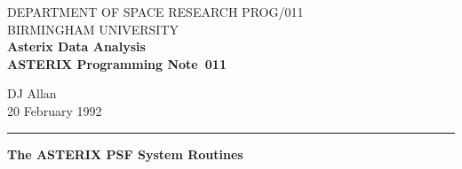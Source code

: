 
\pagestyle{myheadings} 
\newcommand{\astdoccategory}  {ASTERIX Programming Note} 
\newcommand{\astdocinitials}  {PROG} 
\newcommand{\astdocnumber}    {011} 
\newcommand{\astdocauthors}   {DJ Allan} 
\newcommand{\astdocdate}      {20 February 1992} 
\newcommand{\astdoctitle}     {The ASTERIX PSF System Routines} 
\newcommand{\astdocname}      {\astdocinitials /\astdocnumber} 

\renewcommand{\_}             {{\tt\char'137}} 
 
\newcommand{\Array}{\mbox{\tt Array}}
\newcommand{\BinDS}{\mbox{\tt BinDS}}
\newcommand{\EventDS}{\mbox{\tt EventDS}}
\newcommand{\File}{\mbox{\tt File}}
\newcommand{\Scalar}{\mbox{\tt Scalar}}
\newcommand{\VecArray}{\mbox{\tt VectorisedArray}}
\newcommand{\VecBinDS}{\mbox{\tt VectorisedBinDS}}
\newcommand{\XYimage}{\mbox{\tt XYimage}}
\newcommand{\Ind}{\hspace{3mm}}
 
\setlength{\textwidth}{160mm}           %
\setlength{\textheight}{240mm}          %
\setlength{\oddsidemargin}{0pt}         %
\setlength{\evensidemargin}{0pt}        %
\setlength{\topmargin}{-5mm}            %
\setlength{\headsep}{8mm}               %
\setlength{\parindent}{0mm} 
 
\thispagestyle{empty} 
DEPARTMENT OF SPACE RESEARCH \hfill \astdocname\\ 
BIRMINGHAM UNIVERSITY\\ 
{\large\bf Asterix Data Analysis\\} 
{\large\bf \astdoccategory\ \astdocnumber} 
\begin{flushright} 
\astdocauthors\\ 
\astdocdate 
\end{flushright} 
\vspace{-4mm} 
\rule{\textwidth}{0.5mm} 
\vspace{5mm} 
\begin{center} 
{\huge\bf \astdoctitle} 
\end{center} 
\vspace{5mm} 
 
\parskip=4.0mm
 
\tableofcontents 
 
